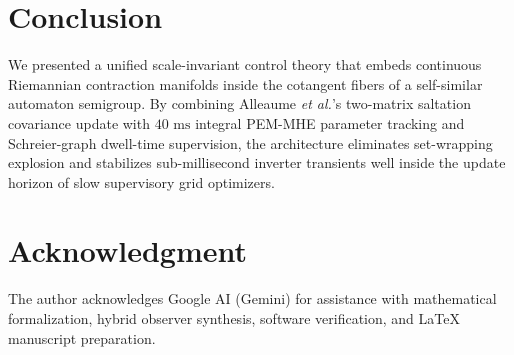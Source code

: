 \documentclass[11pt]{article}
\begin{document}
\section{Conclusion}
We presented a unified scale-invariant control theory that embeds continuous Riemannian contraction manifolds inside the cotangent fibers of a self-similar automaton semigroup. By combining Alleaume \textit{et al.}'s two-matrix saltation covariance update with $40\text{ ms}$ integral PEM-MHE parameter tracking and Schreier-graph dwell-time supervision, the architecture eliminates set-wrapping explosion and stabilizes sub-millisecond inverter transients well inside the update horizon of slow supervisory grid optimizers.


\section*{Acknowledgment}
The author acknowledges Google AI (Gemini) \cite{google_gemini_2026} for assistance with mathematical formalization, hybrid observer synthesis, software verification, and \LaTeX{} manuscript preparation.



\end{document}
